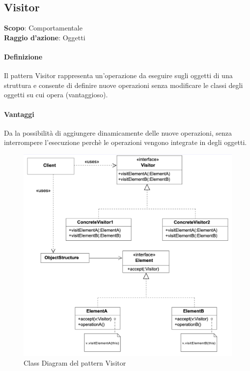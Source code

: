 \subsection{Visitor}
\label{visitor}

\textbf{Scopo}: Comportamentale \\
\textbf{Raggio d'azione}: Oggetti

\paragraph{Definizione} Il pattern Visitor rappresenta un’operazione da eseguire sugli oggetti di una struttura e consente di definire nuove operazioni senza modificare le classi degli oggetti su cui opera (vantaggioso).

\paragraph{Vantaggi} Da la possibilità di aggiungere dinamicamente delle nuove operazioni, senza interrompere l'esecuzione perchè le operazioni vengono integrate in degli oggetti.

\begin{figure}[H]
    \centering
    \includegraphics[width=1\linewidth]{assets/pattern/visitor/visitor-struttura.png}
    \caption{Class Diagram del pattern Visitor}
\end{figure}

